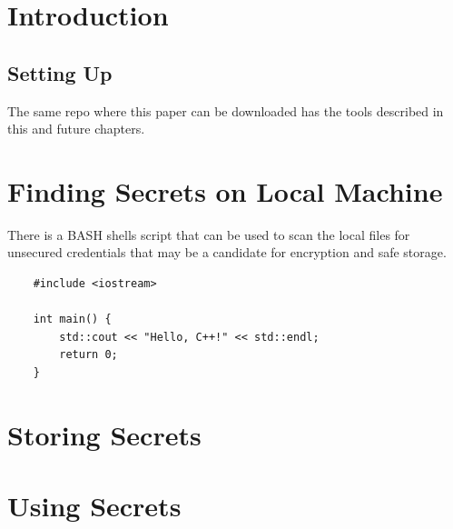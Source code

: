 \documentclass[11pt]{report}
\begin{document}
	\cleardoublepage


	\tableofcontents
	\thispagestyle{empty}
	\cleardoublepage
	\setcounter{page}{1}


	\chapter{Introduction}

    \lipsum[1]

	\section{Setting Up}

	The same repo where this paper can be downloaded has the tools described in this and future chapters.

\chapter{Finding Secrets on Local Machine}

There is a BASH shells script that can be used to scan the local files for
unsecured credentials that may be a candidate for encryption and safe storage.

\begin{verbatim}
    #include <iostream>

    int main() {
        std::cout << "Hello, C++!" << std::endl;
        return 0;
    }
\end{verbatim}

\chapter{Storing Secrets}

	\lipsum[1]

	\chapter{Using Secrets}

	\lipsum[1]
\end{document}
